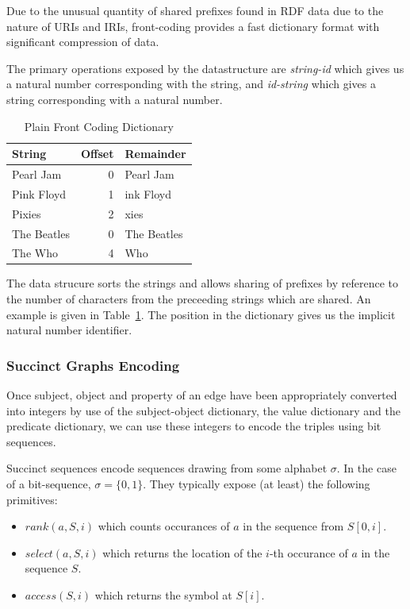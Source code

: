 \documentclass[10pt, a4paper, twocolumn]{article} %
\begin{document}
Due to the unusual quantity of shared prefixes found in RDF data due
to the nature of URIs and IRIs, front-coding provides a fast
dictionary format with significant compression of
data\cite{MARTINEZPRIETO201673}.

The primary operations exposed by the datastructure are {\em
  string-id} which gives us a natural number corresponding with the
string, and {\em id-string} which gives a string corresponding with a
natural number.

\begin{table}
	\centering
	\begin{tabular}{l|rl}
		\toprule
		String & Offset & Remainder \\
		\midrule
        Pearl Jam & 0 & Pearl Jam \\
        Pink Floyd & 1 & ink Floyd \\
        Pixies & 2 & xies \\
		The Beatles & 0 & The Beatles \\
		The Who & 4 & Who \\
		\bottomrule
	\end{tabular}
    \caption{Plain Front Coding Dictionary}
    \label{tab:pfc}
\end{table}

The data strucure sorts the strings and allows sharing of prefixes by
reference to the number of characters from the preceeding strings
which are shared. An example is given in Table~\ref{tab:pfc}. The
position in the dictionary gives us the implicit natural number
identifier.

\subsubsection{Succinct Graphs Encoding}

Once subject, object and property of an edge have been appropriately
converted into integers by use of the subject-object dictionary, the
value dictionary and the predicate dictionary, we can use these
integers to encode the triples using bit sequences.

Succinct sequences encode sequences drawing from some alphabet
\(\sigma\). In the case of a bit-sequence, \(\sigma=\{0,1\}\). They
typically expose (at least) the following primitives:

\begin{itemize}
\item \(rank(a, S, i)\) which counts occurances of \(a\) in the sequence from \(S[0,i]\).
\item \(select(a, S, i)\) which returns the location of the \(i\)-th
  occurance of \(a\) in the sequence \(S\).
\item \(access(S, i)\) which returns the symbol at \(S[i]\).
\end{itemize}
\end{document}
